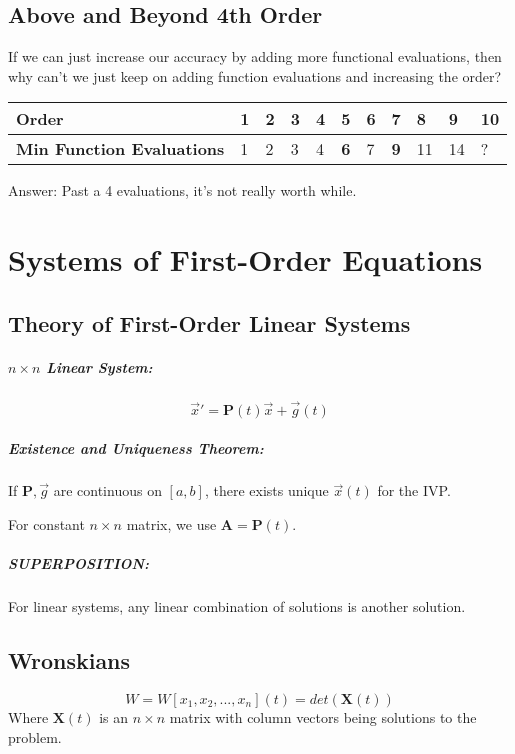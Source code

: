 \documentclass[a4paper,12pt]{report}
\begin{document}
\section{Above and Beyond 4th Order}
If we can just increase our accuracy by adding more functional evaluations, then why can't we just keep on 
adding function evaluations and increasing the order?

\begin{tabular}{l|llllllllll}
\textbf{Order} & 1 & 2 & 3 & 4 & 5 & 6 & 7 & 8 & 9 & 10 \\
\hline
\textbf{Min Function Evaluations} & 1 & 2 & 3 & 4 & \textbf{6} & 7 & \textbf{9} & 11 & 14 & ? \\
\end{tabular}

Answer: Past a 4 evaluations, it's not really worth while.

\chapter{Systems of First-Order Equations}
\section{Theory of First-Order Linear Systems}
\paragraph{$n\times n$ Linear System: } $$\vec{x}' = \pmb{P}(t)\vec{x} + \vec{g}(t)$$
\paragraph{Existence and Uniqueness Theorem: } If $\pmb{P},\vec{g}$ are continuous on $[a, b]$, there exists unique $\vec{x}(t)$ for the IVP. 

For constant $n\times n $ matrix, we use $\pmb{A} = \pmb{P}(t)$. 

\paragraph{SUPERPOSITION: } For linear systems, any linear combination of solutions is another solution. 

\section{Wronskians}
$$W = W[x_1,x_2,..., x_n](t) = det(\pmb{X}(t))$$
Where $\pmb{X}(t)$ is an $n\times n$ matrix with column vectors being solutions to the problem. 
\end{document}
